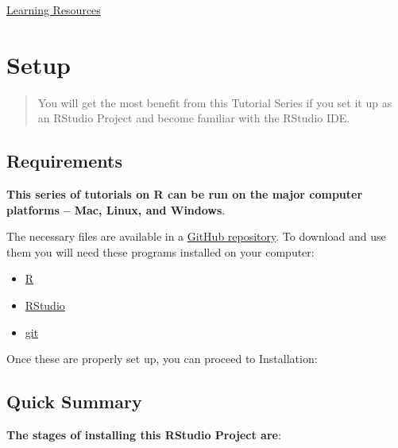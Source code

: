 \documentclass[]{book}
\providecommand{\tightlist}{%
  \setlength{\itemsep}{0pt}\setlength{\parskip}{0pt}}
\theoremstyle{definition}
\theoremstyle{definition}
\theoremstyle{definition}
\theoremstyle{remark}
\begin{document}
\href{R_Learning_Resources.html}{Learning Resources}

\hypertarget{setup}{%
\chapter{Setup}\label{setup}}

\begin{quote}
You will get the most benefit from this Tutorial Series if you set it up
as an RStudio Project and become familiar with the RStudio IDE.
\end{quote}

\hypertarget{requirements}{%
\section{Requirements}\label{requirements}}

\textbf{This series of tutorials on R can be run on the major computer
platforms -- Mac, Linux, and Windows}.

The necessary files are available in a
\href{https://github.com/stuzog/Intro2R.git}{GitHub repository}. To
download and use them you will need these programs installed on your
computer:

\begin{itemize}
\tightlist
\item
  \href{https://www.r-project.org/}{R}
\item
  \href{https://www.rstudio.com/products/rstudio/download/}{RStudio}
\item
  \href{https://git-scm.com/book/en/v2/Getting-Started-Installing-Git}{git}
\end{itemize}

Once these are properly set up, you can proceed to Installation:

\hypertarget{quick-summary}{%
\section{Quick Summary}\label{quick-summary}}

\textbf{The stages of installing this RStudio Project are}:
\end{document}
